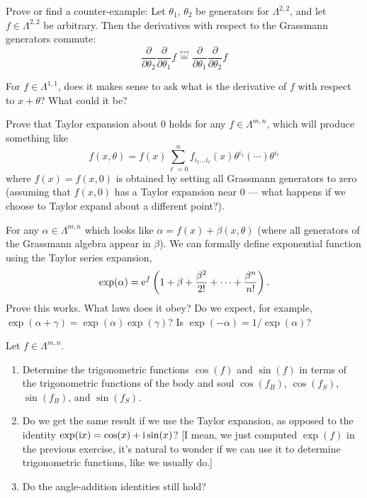 \begin{exercise}
Prove or find a counter-example: Let $\theta_{1}$, $\theta_{2}$ be
generators for $\Lambda^{2,2}$, and let $f\in\Lambda^{2,2}$ be
arbitrary. Then the derivatives with respect to the Grassmann generators commute:
\begin{equation}
\frac{\partial}{\partial\theta_{2}}\frac{\partial}{\partial\theta_{1}}f
\stackrel{???}{=}\frac{\partial}{\partial\theta_{1}}\frac{\partial}{\partial\theta_{2}}f
\end{equation}
\end{exercise}


\begin{puzzle}
For $f\in\Lambda^{1,1}$, does it makes sense to ask what is the
derivative of $f$ with respect to $x+\theta$? What could it be?
\end{puzzle}

\begin{exercise}
Prove that Taylor expansion about 0 holds for any $f\in\Lambda^{m,n}$, which
will produce something like
\begin{equation}
f(x,\theta) = f(x)\sum^{n}_{\ell=0}f_{i_{1}\dots i_{\ell}}(x)\theta^{i_{1}}(\cdots)\theta^{i_{\ell}}
\end{equation}
where $f(x)=f(x,0)$ is obtained by setting all Grassmann generators to
zero (assuming that $f(x,0)$ has a Taylor expansion near $0$ --- what
happens if we choose to Taylor expand about a different point?).
\end{exercise}


\begin{exercise}\label{xca:differentiation:taylor-series-for-exp}
For any $\alpha\in\Lambda^{m,n}$ which looks like
$\alpha=f(x)+\beta(x,\theta)$ (where all generators of the
Grassmann algebra appear in $\beta$). We can formally define exponential
function using the Taylor series expansion,
\begin{equation}
\exp(\alpha) = \mathrm{e}^{f}\left(1 + \beta + \frac{\beta^{2}}{2!} + \dots + \frac{\beta^{n}}{n!}\right).
\end{equation}
Prove this works. What laws does it obey? Do we expect, for example, $\exp(\alpha+\gamma)=\exp(\alpha)\exp(\gamma)$?
Is $\exp(-\alpha)=1/\exp(\alpha)$?
\end{exercise}

\begin{exercise}
  Let $f\in\Lambda^{m,n}$.
  \begin{enumerate}
  \item Determine the trigonometric functions $\cos(f)$ and $\sin(f)$ in terms
of the trigonometric functions of the body and soul $\cos(f_{B})$,
$\cos(f_{S})$, $\sin(f_{B})$, and $\sin(f_{S})$.
\item Do we get the same result if we use the Taylor expansion, as opposed to
the identity $\exp(\mathrm{i} x)=\cos(x)+\mathrm{i}\sin(x)$? [I mean, we just computed
  $\exp(f)$ in the previous exercise, it's natural to wonder if we can
  use it to determine trigonometric functions, like we usually do.]
\item Do the angle-addition identities still hold?
  \end{enumerate}
\end{exercise}


